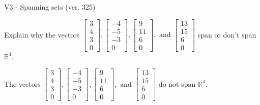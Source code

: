 \begin{exercise}
  \begin{exerciseTitle}V3 - Spanning sets (ver. 325)\end{exerciseTitle}
  \begin{exerciseStatement}
    Explain why the vectors \(\left[\begin{array}{r}
3 \\
4 \\
3 \\
0
\end{array}\right] , \left[\begin{array}{r}
-4 \\
-5 \\
-3 \\
0
\end{array}\right] , \left[\begin{array}{r}
9 \\
11 \\
6 \\
0
\end{array}\right] , \text{ and } \left[\begin{array}{r}
13 \\
15 \\
6 \\
0
\end{array}\right]\) span or don't span \(\mathbb{R}^4\). 
	


  \end{exerciseStatement}
  \begin{exerciseAnswer}
   The vectors \(\left[\begin{array}{r}
3 \\
4 \\
3 \\
0
\end{array}\right] , \left[\begin{array}{r}
-4 \\
-5 \\
-3 \\
0
\end{array}\right] , \left[\begin{array}{r}
9 \\
11 \\
6 \\
0
\end{array}\right] , \text{ and } \left[\begin{array}{r}
13 \\
15 \\
6 \\
0
\end{array}\right]\) 
  	 do not  
	span \(\mathbb{R}^4\).
  


  \end{exerciseAnswer}
\end{exercise}